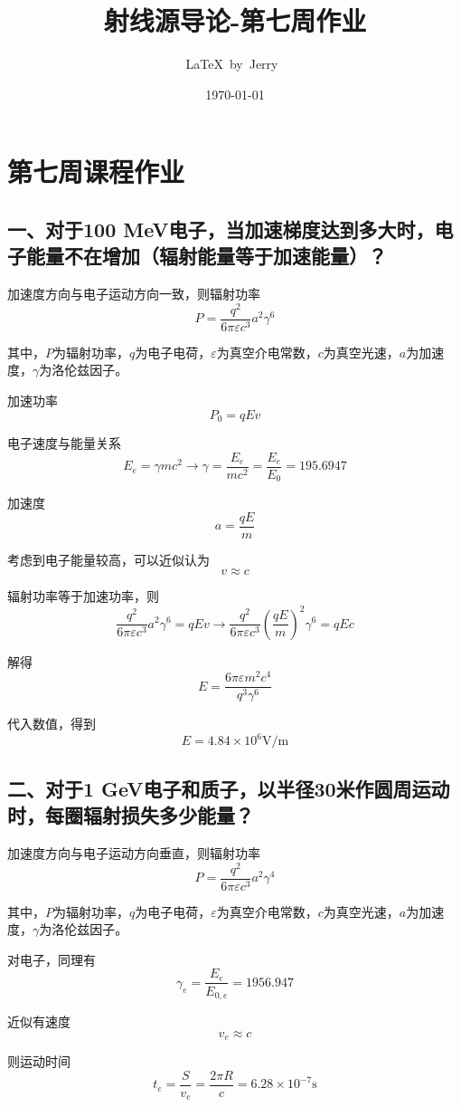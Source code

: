 \documentclass{article}
\title{射线源导论-第七周作业}
\author{\LaTeX\ by\ Jerry\ }
\date{\today}
\begin{document}
\pagestyle{fancy}

\fancyhead[R]{\today}

\section*{第七周课程作业}

\subsection*{一、对于100 MeV电子，当加速梯度达到多大时，电子能量不在增加（辐射能量等于加速能量）？}

加速度方向与电子运动方向一致，则辐射功率 $$P = \frac{q^2}{6\pi\varepsilon c^3}a^2\gamma^6$$

其中，$P$为辐射功率，$q$为电子电荷，$\varepsilon$为真空介电常数，$c$为真空光速，$a$为加速度，$\gamma$为洛伦兹因子。

加速功率 $$P_0 = qEv $$

电子速度与能量关系 $$E_e = \gamma m c^2 \rightarrow \gamma = \frac{E_e}{mc^2} = \frac{E_e}{E_0} = 195.6947$$

加速度$$ a = \frac{qE}{m} $$

考虑到电子能量较高，可以近似认为$$ v \approx c$$

辐射功率等于加速功率，则 $$\frac{q^2}{6\pi\varepsilon c^3}a^2\gamma^6 = qEv \rightarrow \frac{q^2}{6\pi\varepsilon c^3}\left(\frac{qE}{m}\right)^2\gamma^6 = qEc $$

解得$$E = \frac{6\pi\varepsilon m^2 c^4}{q^3 \gamma^6}$$

代入数值，得到$$ E = 4.84 \times {10}^{6} \text{V/m}$$

\subsection*{二、对于1 GeV电子和质子，以半径30米作圆周运动时，每圈辐射损失多少能量？}

加速度方向与电子运动方向垂直，则辐射功率 $$P = \frac{q^2}{6\pi\varepsilon c^3}a^2\gamma^4$$

其中，$P$为辐射功率，$q$为电子电荷，$\varepsilon$为真空介电常数，$c$为真空光速，$a$为加速度，$\gamma$为洛伦兹因子。

对电子，同理有$$\gamma_e = \frac{E_e}{E_{0, e}} = 1956.947$$

近似有速度 $$ v_e \approx c $$

则运动时间 $$ t_e = \frac{S}{v_e} = \frac{2\pi R}{c} = 6.28 \times {10}^{-7} \text{s}$$
\end{document}
